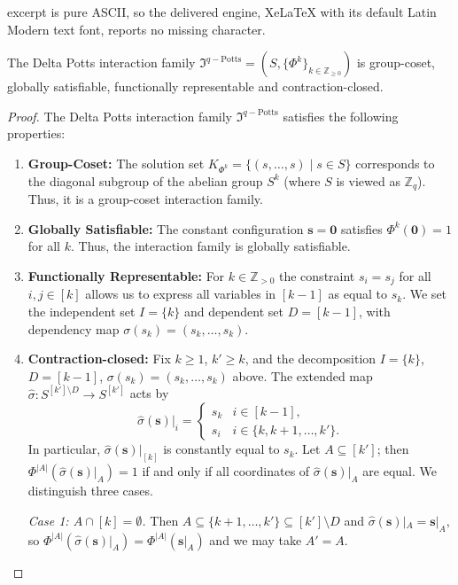 \documentclass[10pt,a4paper]{amsart}
\newcommand{\mcp}{\mathfrak{I}^{q-\mathrm{Potts}}}
\newcommand{\veco}{\boldsymbol{0}}
\newcommand{\vecs}{\boldsymbol{s}}
\begin{document}
excerpt is pure ASCII, so the delivered engine, XeLaTeX with its default Latin Modern text font, reports no missing character.
\begin{proposition}[Properties of $\mcp$]
    The Delta Potts interaction family $\mcp = (S, \{\Phi^k\}_{k \in \mathbb{Z}_{\geq 0}})$ is group-coset, globally satisfiable, functionally representable and contraction-closed.
\end{proposition}

\begin{proof}
    The Delta Potts interaction family $\mcp$ satisfies the following properties:
    \begin{enumerate}
        \item \textbf{Group-Coset:} The solution set $K_{\Phi^k} = \{ (s, \dots, s) \mid s \in S \}$ corresponds to the diagonal subgroup of the abelian group $S^k$ (where $S$ is viewed as $\mathbb{Z}_q$). Thus, it is a group-coset interaction family.
        \item \textbf{Globally Satisfiable:} The constant configuration $\vecs = \veco$ satisfies $\Phi^k(\veco) = 1$ for all $k$. Thus, the interaction family is globally satisfiable.
        \item \textbf{Functionally Representable:} For $k \in \mathbb{Z}_{>0}$ the constraint $s_i = s_j$ for all $i,j \in [k]$ allows us to express all variables in $[k-1]$ as equal to $s_k$. We set the independent set $I=\{k\}$ and dependent set $D = [k-1]$, with dependency map $\sigma(s_k) = (s_k, \dots, s_k)$.
        \item \textbf{Contraction-closed:} Fix $k \geq 1$, $k' \geq k$, and the
decomposition $I = \{k\}$, $D = [k-1]$, $\sigma(s_k) = (s_k, \dots, s_k)$
above. The extended map $\hat\sigma \colon S^{[k'] \setminus D} \to S^{[k']}$
acts by
\[
    \hat\sigma(\vecs)|_i =
    \begin{cases}
        s_k & i \in [k-1], \\
        s_i & i \in \{k, k+1, \dots, k'\}.
    \end{cases}
\]
In particular, $\hat\sigma(\vecs)|_{[k]}$ is constantly equal to $s_k$. Let
$A \subseteq [k']$; then $\Phi^{|A|}(\hat\sigma(\vecs)|_A) = 1$ if and
only if all coordinates of $\hat\sigma(\vecs)|_A$ are equal. We
distinguish three cases.

\emph{Case 1: $A \cap [k] = \emptyset$.} Then $A \subseteq
\{k+1,\dots,k'\} \subseteq [k'] \setminus D$ and $\hat\sigma(\vecs)|_A =
\vecs|_A$, so $\Phi^{|A|}(\hat\sigma(\vecs)|_A) = \Phi^{|A|}(\vecs|_A)$
and we may take $A' = A$.


\end{enumerate}
\end{proof}
\end{document}
